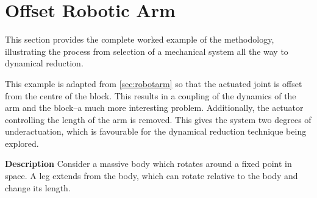 \documentclass[main.tex]{subfiles}
\begin{document}
\section{Offset Robotic Arm}\label{sec:robotarmoffset} 
This section provides the complete worked example of the methodology, illustrating the process from selection of a mechanical system all the way to dynamical reduction. 

This example is adapted from \ref{sec:robotarm}  so that the actuated joint is offset from the centre of the block. This results in a coupling of the dynamics of the arm and the block--a much more interesting problem. Additionally, the actuator controlling the length of the arm is removed. This gives the system two degrees of underactuation, which is favourable for the dynamical reduction technique being explored.

\textbf{Description} Consider a massive body which rotates around a fixed point in space. A leg extends from the body, which can rotate relative to the body and change its length.
\end{document}
